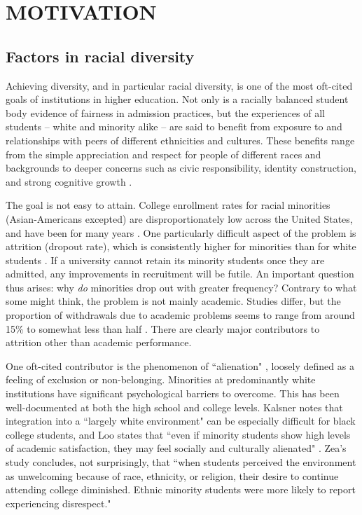 \section{MOTIVATION}
\label{sec:intro}

\subsection{Factors in racial diversity}

Achieving diversity, and in particular racial diversity, is one of the most
oft-cited goals of institutions in higher education. Not only is a racially
balanced student body evidence of fairness in admission practices, but the
experiences of all students -- white and minority alike -- are said to benefit
from exposure to and relationships with peers of different ethnicities and
cultures. These benefits range from the simple appreciation and respect for
people of different races and backgrounds to deeper concerns such as civic
responsibility, identity construction, and strong cognitive growth
\cite{gurin_diversity_2002}.

The goal is not easy to attain. College enrollment rates for racial minorities
(Asian-Americans excepted) are disproportionately low across the United
States, and have been for many years \cite{ryu_minorities_2010}. One
particularly difficult aspect of the problem is attrition (dropout rate),
which is consistently higher for minorities than for white students
\cite{zea_predicting_1997}. If a university cannot retain its minority
students once they are admitted, any improvements in recruitment will be
futile. An important question thus arises: why \textit{do} minorities drop out
with greater frequency? Contrary to what some might think, the problem is not
mainly academic. Studies differ, but the proportion of withdrawals due to
academic problems seems to range from around 15\% \cite{kalsner_issues_1991}
to somewhat less than half \cite{suen_alienation_1983}. There are clearly
major contributors to attrition other than academic performance.

One oft-cited contributor is the phenomenon of ``alienation"
\cite{burbach_development_1972,dean_alienation:_1961}, loosely defined as a
feeling of exclusion or non-belonging. Minorities at predominantly white
institutions have significant psychological barriers to overcome. This has
been well-documented at both the high school \cite{calabrese_structure_1988}
and college \cite{nora_role_1996} levels. Kalsner notes that integration into
a ``largely white environment" can be especially difficult for black college
students, and Loo states that ``even if minority students show high levels of
academic satisfaction, they may feel socially and culturally alienated"
\cite{loo_alienation_1986}. Zea's study concludes, not surprisingly, that
``when students perceived the environment as unwelcoming because of race,
ethnicity, or religion, their desire to continue attending college diminished.
Ethnic minority students were more likely to report experiencing disrespect."
\cite{zea_predicting_1997}

